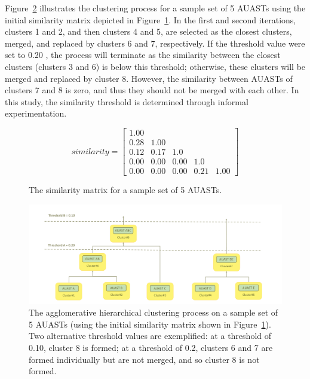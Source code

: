 Figure~\ref{fig:overview2} illustrates the clustering process for a sample set of 5 AUASTs using the initial similarity matrix depicted in Figure~\ref{matrix}. In the first and second iterations, clusters 1 and 2, and then clusters 4 and 5, are selected as the closest clusters, merged, and replaced by clusters 6 and 7, respectively. If the threshold value were set to %
0.20%
, the process will terminate as the similarity between the closest clusters (clusters 3 and 6) is below this threshold; otherwise, these clusters will be merged and replaced by cluster 8. However, the similarity between AUASTs of clusters 7 and 8 is zero, and thus they should not be merged with each other. In this study, the similarity threshold is determined through informal experimentation.


\begin{figure} [!h]
\begin{displaymath}
    similarity = \left[
        \begin{matrix}
        1.00 &  &  &  &   \\
0.28 & 1.00 &  &  &  \\
0.12 & 0.17 & 1.0 &  &  \\
0.00 & 0.00 & 0.00 & 1.0 &  \\
0.00 & 0.00 & 0.00 & 0.21 & 1.00
        \end{matrix}   \right]
\end{displaymath}
 \caption{The similarity matrix for a sample set of 5 AUASTs.}
  \label{matrix}
\end{figure}




\begin{figure} [p]
  \centering\includegraphics [width = \textwidth]{Drawing4/overview2.pdf}
  \caption{The agglomerative hierarchical clustering process on a sample set of  5 AUASTs (using the initial similarity matrix shown in Figure~\ref{matrix}). Two alternative threshold values are exemplified: at a threshold of 0.10, cluster 8 is formed; at a threshold of 0.2, clusters 6 and 7 are formed individually but are not merged, and so cluster 8 is not formed.}
  \label{fig:overview2}
\end{figure}


